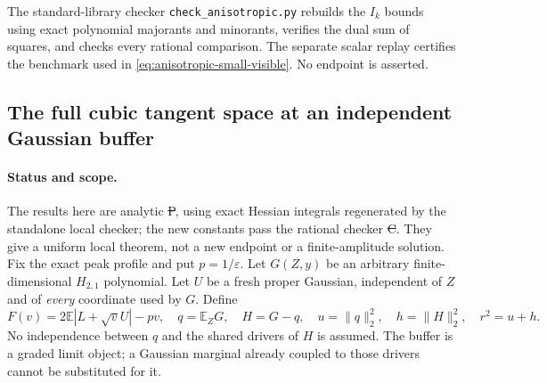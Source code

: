 The standard-library checker \texttt{check\_anisotropic.py} rebuilds the
$I_k$ bounds using exact polynomial majorants and minorants, verifies the
dual sum of squares, and checks every rational comparison. The separate
scalar replay certifies the benchmark used in
\eqref{eq:anisotropic-small-visible}. No endpoint is asserted.

\subsection{The full cubic tangent space at an independent Gaussian buffer}
\label{sec:buffered-full-tangent}
\paragraph{Status and scope.}
The results here are analytic \st{P}, using exact Hessian integrals regenerated by the standalone local
checker; the new constants pass the rational
checker  \st{C}. They give a
uniform local theorem, not a new endpoint or a finite-amplitude solution.
Fix the exact peak profile and put $p=1/\varepsilon$. Let $G(Z,y)$ be
an arbitrary finite-dimensional $H_{2,1}$ polynomial. Let $U$ be a fresh
proper Gaussian, independent of $Z$ and of \emph{every} coordinate used
by $G$. Define
\[
 F(v)=2\mathbb E|L+\sqrt vU|-pv,\quad q=\mathbb E_ZG,\quad H=G-q,
 \quad u=\|q\|_2^2,\quad h=\|H\|_2^2,\quad r^2=u+h.
\]
No independence between $q$ and the shared drivers of $H$ is assumed.
The buffer is a graded limit object; a Gaussian marginal already
coupled to those drivers cannot be substituted for it.

